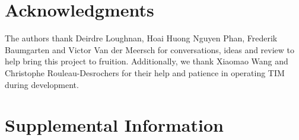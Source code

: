 \documentclass[a4paper,12pt]{article}
\begin{document}


\section{Acknowledgments} %
The authors thank Deirdre Loughnan, Hoai Huong Nguyen Phan, Frederik Baumgarten and Victor Van der Meersch for conversations, ideas and review to help bring this project to fruition. Additionally, we thank Xiaomao Wang and Christophe Rouleau-Desrochers for their help and patience in operating TIM during development. 

\section{Supplemental Information}
\end{document}
